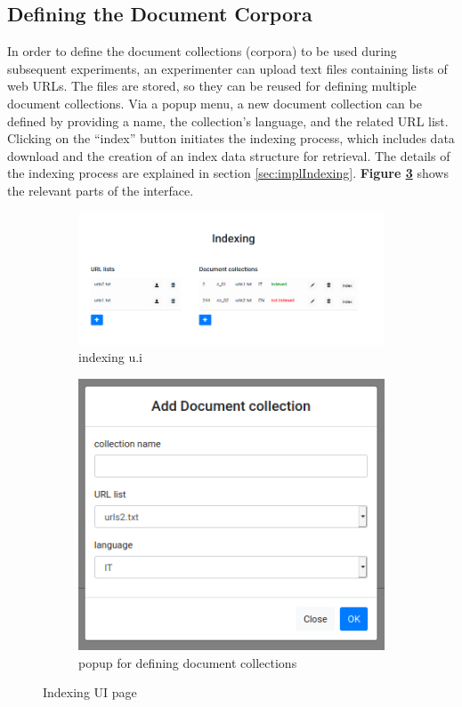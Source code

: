 \documentclass[a4paper]{usiinfbachelorproject}
\begin{document}
\subsection{\textbf{Defining the Document Corpora}} \label{sec:designDefineDocs}

In order to define the document collections (corpora) to be used during subsequent experiments, 
an experimenter can upload text files containing lists of web URLs. The files are  stored, so they can be reused 
for defining multiple document collections. Via a popup menu, a new  document collection can be defined by providing a name, 
the collection's language, and the related URL list.
Clicking on the ``index'' button initiates the indexing process, which includes data download and the creation of an index
data structure for retrieval. The details of the indexing process are explained in section \ref{sec:implIndexing}.
\textbf{Figure \ref{fig:indexing}} shows the relevant parts of the interface.

\begin{figure}[h]
     
     \centering
     \begin{subfigure}[b]{0.6\textwidth}
         \centering
         \includegraphics[width=.8\linewidth]{figures/indexing1}
         \caption{indexing  u.i}
         \label{fig:indexingA}
     \end{subfigure}
     \begin{subfigure}[b]{0.3\textwidth}
         \centering
         \includegraphics[width=.6\linewidth]{figures/indexing2}
         \caption{popup for defining  document collections}
         \label{fig:indexingB}
     \end{subfigure}
     \caption{Indexing UI page}
     \label{fig:indexing}

\end{figure}
\end{document}
